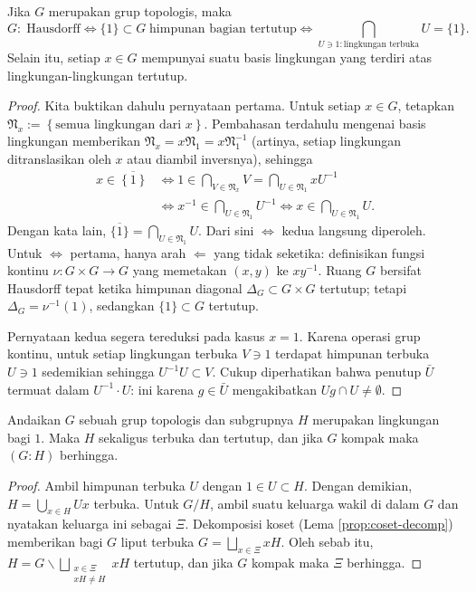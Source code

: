 \begin{lemma}\label{prop:top-group-separation}
	Jika $G$ merupakan grup topologis, maka
	\begin{equation}\label{eqn:top-group-Hausdorff}
		G:\; \text{Hausdorff} \iff \{1\} \subset G\; \text{himpunan bagian tertutup} \iff \bigcap_{U \ni 1: \text{lingkungan terbuka}} U = \{1\}.
	\end{equation}
	Selain itu, setiap $x \in G$ mempunyai suatu basis lingkungan yang terdiri atas lingkungan-lingkungan tertutup.
\end{lemma}
\begin{proof}
	Kita buktikan dahulu pernyataan pertama. Untuk setiap $x \in G$, tetapkan $\mathfrak{N}_x := \left\{ \text{semua lingkungan dari } x \right\}$. Pembahasan terdahulu mengenai basis lingkungan memberikan $\mathfrak{N}_x = x\mathfrak{N}_1 = x \mathfrak{N}_1^{-1}$ (artinya, setiap lingkungan ditranslasikan oleh $x$ atau diambil inversnya), sehingga
	\begin{equation*}\begin{aligned}
		x \in \overline{\left\{ 1 \right\}} & \iff 1 \in \bigcap_{V \in \mathfrak{N}_x} V = \bigcap_{U \in \mathfrak{N}_1} xU^{-1} \\
		& \iff x^{-1} \in \bigcap_{U \in \mathfrak{N}_1} U^{-1} \iff x \in \bigcap_{U \in \mathfrak{N}_1} U.
	\end{aligned}\end{equation*}
	Dengan kata lain, $\overline{\{1\}} = \bigcap_{U \in \mathfrak{N}_1} U$. Dari sini $\iff$ kedua langsung diperoleh. Untuk $\iff$ pertama, hanya arah $\Leftarrow$ yang tidak seketika: definisikan fungsi kontinu $\nu: G \times G \to G$ yang memetakan $(x,y)$ ke $xy^{-1}$. Ruang $G$ bersifat Hausdorff tepat ketika himpunan diagonal $\Delta_G \subset G \times G$ tertutup; tetapi $\Delta_G = \nu^{-1}(1)$, sedangkan $\{1\} \subset G$ tertutup.

	Pernyataan kedua segera tereduksi pada kasus $x=1$. Karena operasi grup kontinu, untuk setiap lingkungan terbuka $V \ni 1$ terdapat himpunan terbuka $U \ni 1$ sedemikian sehingga $U^{-1}U \subset V$. Cukup diperhatikan bahwa penutup $\bar{U}$ termuat dalam $U^{-1} \cdot U$: ini karena $g \in \bar{U}$ mengakibatkan $Ug \cap U \neq \emptyset$.
\end{proof}

\begin{lemma}\label{prop:open-closed-subgroup}
	Andaikan $G$ sebuah grup topologis dan subgrupnya $H$ merupakan lingkungan bagi $1$. Maka $H$ sekaligus terbuka dan tertutup, dan jika $G$ kompak maka $(G:H)$ berhingga.
\end{lemma}
\begin{proof}
	Ambil himpunan terbuka $U$ dengan $1 \in U \subset H$. Dengan demikian, $H = \bigcup_{x \in H} Ux$ terbuka. Untuk $G/H$, ambil suatu keluarga wakil di dalam $G$ dan nyatakan keluarga ini sebagai $\Xi$. Dekomposisi koset (Lema \ref{prop:coset-decomp}) memberikan bagi $G$ liput terbuka $G = \bigsqcup_{x \in \Xi} xH$. Oleh sebab itu, $H = G \smallsetminus \bigsqcup_{\substack{x \in \Xi \\ xH \neq H}} xH$ tertutup, dan jika $G$ kompak maka $\Xi$ berhingga.
\end{proof}

